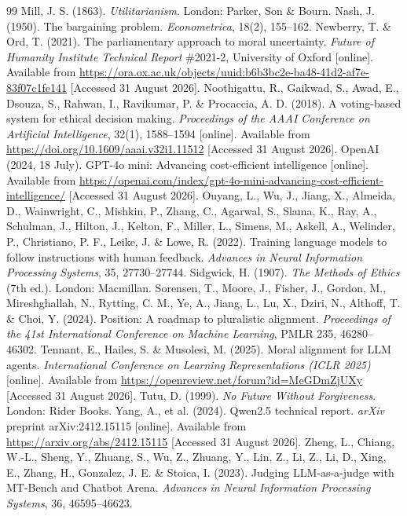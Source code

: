 \documentclass[10pt,twocolumn,a4paper]{article}
\begin{document}
\begin{thebibliography}{99}
 Mill, J. S. (1863). \textit{Utilitarianism}. London: Parker, Son \& Bourn.
 Nash, J. (1950). The bargaining problem. \textit{Econometrica}, 18(2), 155--162.
 Newberry, T. \& Ord, T. (2021). The parliamentary approach to moral uncertainty. \textit{Future of Humanity Institute Technical Report} \#2021-2, University of Oxford [online]. Available from \url{https://ora.ox.ac.uk/objects/uuid:b6b3bc2e-ba48-41d2-af7e-83f07c1fe141} [Accessed 31 August 2026].
 Noothigattu, R., Gaikwad, S., Awad, E., Dsouza, S., Rahwan, I., Ravikumar, P. \& Procaccia, A. D. (2018). A voting-based system for ethical decision making. \textit{Proceedings of the AAAI Conference on Artificial Intelligence}, 32(1), 1588--1594 [online]. Available from \url{https://doi.org/10.1609/aaai.v32i1.11512} [Accessed 31 August 2026].
 OpenAI (2024, 18 July). GPT-4o mini: Advancing cost-efficient intelligence [online]. Available from \url{https://openai.com/index/gpt-4o-mini-advancing-cost-efficient-intelligence/} [Accessed 31 August 2026].
 Ouyang, L., Wu, J., Jiang, X., Almeida, D., Wainwright, C., Mishkin, P., Zhang, C., Agarwal, S., Slama, K., Ray, A., Schulman, J., Hilton, J., Kelton, F., Miller, L., Simens, M., Askell, A., Welinder, P., Christiano, P. F., Leike, J. \& Lowe, R. (2022). Training language models to follow instructions with human feedback. \textit{Advances in Neural Information Processing Systems}, 35, 27730--27744.
 Sidgwick, H. (1907). \textit{The Methods of Ethics} (7th ed.). London: Macmillan.
 Sorensen, T., Moore, J., Fisher, J., Gordon, M., Mireshghallah, N., Rytting, C. M., Ye, A., Jiang, L., Lu, X., Dziri, N., Althoff, T. \& Choi, Y. (2024). Position: A roadmap to pluralistic alignment. \textit{Proceedings of the 41st International Conference on Machine Learning}, PMLR 235, 46280--46302.
 Tennant, E., Hailes, S. \& Musolesi, M. (2025). Moral alignment for LLM agents. \textit{International Conference on Learning Representations (ICLR 2025)} [online]. Available from \url{https://openreview.net/forum?id=MeGDmZjUXy} [Accessed 31 August 2026].
 Tutu, D. (1999). \textit{No Future Without Forgiveness}. London: Rider Books.
 Yang, A., et al. (2024). Qwen2.5 technical report. \textit{arXiv} preprint arXiv:2412.15115 [online]. Available from \url{https://arxiv.org/abs/2412.15115} [Accessed 31 August 2026].
 Zheng, L., Chiang, W.-L., Sheng, Y., Zhuang, S., Wu, Z., Zhuang, Y., Lin, Z., Li, Z., Li, D., Xing, E., Zhang, H., Gonzalez, J. E. \& Stoica, I. (2023). Judging LLM-as-a-judge with MT-Bench and Chatbot Arena. \textit{Advances in Neural Information Processing Systems}, 36, 46595--46623.
\end{thebibliography}
\end{document}
